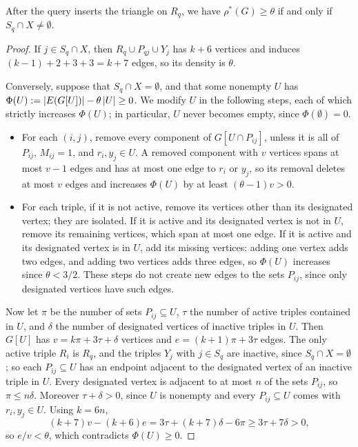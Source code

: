 \begin{lemma}\label{lem:app-density}
After the query inserts the triangle on $R_q$, we have $\rho^*(G)\ge\theta$ if and only if $S_q\cap X\ne\emptyset$.
\end{lemma}
\begin{proof}
If $j\in S_q\cap X$, then $R_q\cup P_{qj}\cup Y_j$ has $k+6$ vertices and induces $(k-1)+2+3+3=k+7$ edges, so its density is $\theta$.

Conversely, suppose that $S_q\cap X=\emptyset$, and that some nonempty $U$ has $\Phi(U):=\left|E(G[U])\right|-\theta\left|U\right|\ge0$. We modify $U$ in the following steps, each of which strictly increases $\Phi(U)$; in particular, $U$ never becomes empty, since $\Phi(\emptyset)=0$.
\begin{itemize}[leftmargin=*]
  \item For each $(i,j)$, remove every component of $G[U\cap P_{ij}]$, unless it is all of $P_{ij}$, $M_{ij}=1$, and $r_i,y_j\in U$. A removed component with $v$ vertices spans at most $v-1$ edges and has at most one edge to $r_i$ or $y_j$, so its removal deletes at most $v$ edges and increases $\Phi(U)$ by at least $(\theta-1)v>0$.
  \item For each triple, if it is not active, remove its vertices other than its designated vertex; they are isolated. If it is active and its designated vertex is not in $U$, remove its remaining vertices, which span at most one edge. If it is active and its designated vertex is in $U$, add its missing vertices: adding one vertex adds two edges, and adding two vertices adds three edges, so $\Phi(U)$ increases since $\theta<3/2$. These steps do not create new edges to the sets $P_{ij}$, since only designated vertices have such edges.
\end{itemize}
Now let $\pi$ be the number of sets $P_{ij}\subseteq U$, $\tau$ the number of active triples contained in $U$, and $\delta$ the number of designated vertices of inactive triples in $U$. Then $G[U]$ has $v=k\pi+3\tau+\delta$ vertices and $e=(k+1)\pi+3\tau$ edges. The only active triple $R_i$ is $R_q$, and the triples $Y_j$ with $j\in S_q$ are inactive, since $S_q\cap X=\emptyset$; so each $P_{ij}\subseteq U$ has an endpoint adjacent to the designated vertex of an inactive triple in $U$. Every designated vertex is adjacent to at most $n$ of the sets $P_{ij}$, so $\pi\le n\delta$. Moreover $\tau+\delta>0$, since $U$ is nonempty and every $P_{ij}\subseteq U$ comes with $r_i,y_j\in U$. Using $k=6n$,
\[
(k+7)v-(k+6)e=3\tau+(k+7)\delta-6\pi\ge3\tau+7\delta>0,
\]
so $e/v<\theta$, which contradicts $\Phi(U)\ge0$.
\end{proof}

